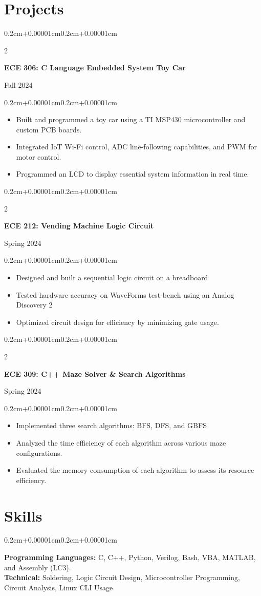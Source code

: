 \documentclass[10pt, letterpaper]{article}
\newenvironment{highlights}{
  \begin{itemize}[topsep=0.10cm,parsep=0.10cm,partopsep=0pt,itemsep=0pt,leftmargin=0.4cm+10pt]
}{\end{itemize}}
\newenvironment{onecolentry}{
  \begin{adjustwidth}{0.2cm+0.00001cm}{0.2cm+0.00001cm}
}{\end{adjustwidth}}
\newenvironment{twocolentry}[2][]{
  \onecolentry
  \def\secondColumn{#2}
  \setcolumnwidth{\fill,4.5cm}
  \begin{paracol}{2}
}{
  \switchcolumn \raggedleft \secondColumn
  \end{paracol}
  \endonecolentry
}
\begin{document}
\section{Projects}
\begin{twocolentry}{Fall 2024}
\textbf{ECE 306: C Language Embedded System Toy Car}
\end{twocolentry}
\begin{onecolentry}
\begin{highlights}
  \item[$\vartriangleright$] Built and programmed a toy car using a TI MSP430 microcontroller and custom PCB boards.
  \item[$\vartriangleright$] Integrated IoT Wi-Fi control, ADC line-following capabilities, and PWM for motor control.
  \item[$\vartriangleright$] Programmed an LCD to display essential system information in real time.
\end{highlights}
\end{onecolentry}

\begin{twocolentry}{Spring 2024}
\textbf{ECE 212: Vending Machine Logic Circuit}
\end{twocolentry}
\begin{onecolentry}
\begin{highlights}
  \item[$\vartriangleright$] Designed and built a sequential logic circuit on a breadboard
  \item[$\vartriangleright$] Tested hardware accuracy on WaveForms test-bench using an Analog Discovery 2
  \item[$\vartriangleright$] Optimized circuit design for efficiency by minimizing gate usage.
\end{highlights}
\end{onecolentry}

\begin{twocolentry}{Spring 2024}
\textbf{ECE 309: C++ Maze Solver \& Search Algorithms}
\end{twocolentry}
\begin{onecolentry}
\begin{highlights}
  \item[$\vartriangleright$] Implemented three search algorithms: BFS, DFS, and GBFS
  \item[$\vartriangleright$] Analyzed the time efficiency of each algorithm across various maze configurations.
  \item[$\vartriangleright$] Evaluated the memory consumption of each algorithm to assess its resource efficiency.
\end{highlights}
\end{onecolentry}

\section{Skills}
\begin{onecolentry}
\textbf{Programming Languages:} C, C++, Python, Verilog, Bash, VBA, MATLAB, and Assembly (LC3).\\
\textbf{Technical:} Soldering, Logic Circuit Design, Microcontroller Programming, Circuit Analysis, Linux CLI Usage
\end{onecolentry}
\end{document}
